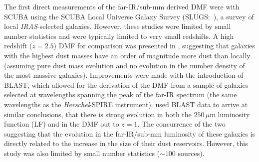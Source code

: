 
The first direct measurements of the far-IR/sub-mm derived DMF were with SCUBA using the SCUBA Local Universe Galaxy Survey \mbox{(SLUGS: \citealt{Dunne_2000, Dunne_2001, Vlahakis_2005})}, a survey of local \textit{IRAS}-selected galaxies. However, these studies were limited by small number statistics and were typically limited to very small redshifts. A high redshift ($z = 2.5$) DMF for comparison was presented in \citealt{Dunne_2003}, suggesting that galaxies with the highest dust masses have an order of magnitude more dust than locally (assuming pure dust mass evolution and no evolution in the number density of the most massive galaxies). Improvements were made with the introduction of BLAST, which allowed for the derivation of the DMF from a sample of galaxies selected at wavelengths spanning the peak of the far-IR spectrum (the same wavelengths as the \textit{Herschel}-SPIRE instrument). \citealt{Eales_2009} used BLAST data to arrive at similar conclusions, that there is strong evolution in both the $250\,\mu$m luminosity function (LF) and in the DMF out to $z = 1$. The concurrence of the two suggesting that the evolution in the far-IR/sub-mm luminosity of these galaxies is directly related to the increase in the size of their dust reservoirs. However, this study was also limited by small number statistics ($\sim 100$ sources).

